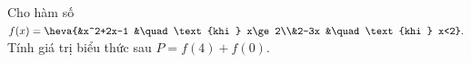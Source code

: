 \begin{ex}%
	Cho hàm số $f(x)=\heva{&x^2+2x-1 &\quad\text{khi } x\ge2\\&2-3x &\quad \text{khi } x<2}.$ \\
	Tính giá trị biểu thức sau $P=f(4)+f(0)$.
\end{ex}


